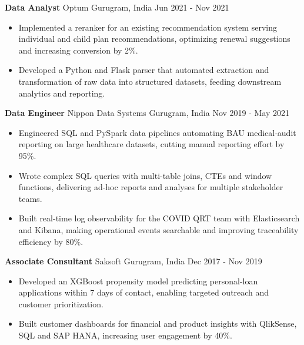\documentclass[10pt,a4paper]{article}
\newcommand{\role}[4]{\textbf{#1} \textbar{} #2 \hfill #3 \textbar{} #4\par}
\begin{document}
\vspace{3pt}
\role{Data Analyst}{Optum}{Gurugram, India}{Jun 2021 - Nov 2021}
\begin{itemize}
  \item Implemented a reranker for an existing recommendation system serving individual and child plan recommendations, optimizing renewal suggestions and increasing conversion by 2\%.
  \item Developed a Python and Flask parser that automated extraction and transformation of raw data into structured datasets, feeding downstream analytics and reporting.
\end{itemize}
\vspace{3pt}
\role{Data Engineer}{Nippon Data Systems}{Gurugram, India}{Nov 2019 - May 2021}
\begin{itemize}
  \item Engineered SQL and PySpark data pipelines automating BAU medical-audit reporting on large healthcare datasets, cutting manual reporting effort by 95\%.
  \item Wrote complex SQL queries with multi-table joins, CTEs and window functions, delivering ad-hoc reports and analyses for multiple stakeholder teams.
  \item Built real-time log observability for the COVID QRT team with Elasticsearch and Kibana, making operational events searchable and improving traceability efficiency by 80\%.
\end{itemize}
\vspace{3pt}
\role{Associate Consultant}{Saksoft}{Gurugram, India}{Dec 2017 - Nov 2019}
\begin{itemize}
  \item Developed an XGBoost propensity model predicting personal-loan applications within 7 days of contact, enabling targeted outreach and customer prioritization.
  \item Built customer dashboards for financial and product insights with QlikSense, SQL and SAP HANA, increasing user engagement by 40\%.
\end{itemize}
\end{document}
